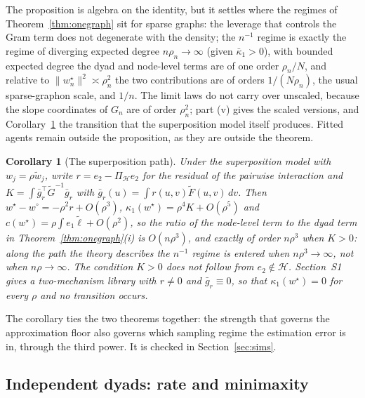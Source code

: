 \documentclass[12pt]{article}
\newtheorem{corollary}{Corollary}
\newcommand{\calH}{\mathcal{H}}
\newcommand{\norm}[1]{\|#1\|}
\newcommand{\wstar}{w^{\star}}
\newcommand{\wproj}{w^{\circ}}
\begin{document}
The proposition is algebra on the identity, but it settles where the regimes of Theorem~\ref{thm:onegraph} sit for sparse graphs: the leverage that controls the Gram term does not degenerate with the density; the $n^{-1}$ regime is exactly the regime of diverging expected degree $n\rho_n\to\infty$ (given $\bar\kappa_1>0$), with bounded expected degree the dyad and node-level terms are of one order $\rho_n/N$, and relative to $\norm{\wstar_n}^2\asymp\rho_n^2$ the two contributions are of orders $1/(N\rho_n)$, the usual sparse-graphon scale, and $1/n$. The limit laws do not carry over unscaled, because the slope coordinates of $G_n$ are of order $\rho_n^2$; part (v) gives the scaled versions, and Corollary~\ref{cor:superposition-path} the transition that the superposition model itself produces. Fitted agents remain outside the proposition, as they are outside the theorem.

\begin{corollary}[The superposition path]
\label{cor:superposition-path}
Under the superposition model with $w_j=\rho\tilde w_j$, write $r=e_2-\Pi_{\calH}e_2$ for the residual of the pairwise interaction and $K=\int\bar g_r^{\top}\tilde G^{-1}\bar g_r$ with $\bar g_r(u)=\int r(u,v)\tilde F(u,v)\,dv$. Then $\wstar-\wproj=-\rho^2r+O(\rho^3)$, $\kappa_1(\wstar)=\rho^4K+O(\rho^5)$ and $c(\wstar)=\rho\int e_1\tilde\ell+O(\rho^2)$, so the ratio of the node-level term to the dyad term in Theorem~\ref{thm:onegraph}(i) is $O(n\rho^3)$, and exactly of order $n\rho^3$ when $K>0$: along the path the theory describes the $n^{-1}$ regime is entered when $n\rho^3\to\infty$, not when $n\rho\to\infty$. The condition $K>0$ does not follow from $e_2\notin\calH$. Section~S1 gives a two-mechanism library with $r\neq0$ and $\bar g_r\equiv0$, so that $\kappa_1(\wstar)=0$ for every $\rho$ and no transition occurs.
\end{corollary}

The corollary ties the two theorems together: the strength that governs the approximation floor also governs which sampling regime the estimation error is in, through the third power. It is checked in Section~\ref{sec:sims}.

\subsection{Independent dyads: rate and minimaxity}
\label{sec:projection}
\end{document}
